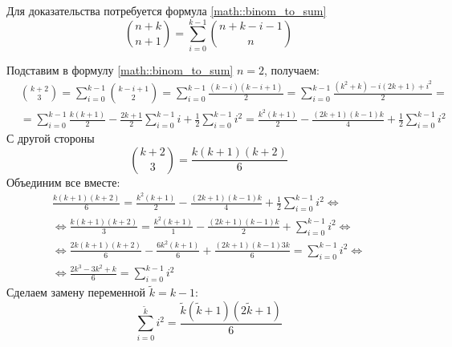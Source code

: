 \documentclass[a4paper,12pt]{article}
\begin{document}
\begin{Solution}
Для доказательства потребуется формула \ref{math::binom_to_sum}
\begin{equation}
	\binom{n+k}{n+1} = \sum_{i=0}^{k-1} \binom{n+k-i-1}{n}
	\label{math::binom_to_sum}
\end{equation}

Подставим в формулу \ref{math::binom_to_sum} $n=2$, получаем:
\[
	\begin{split}
		& \binom{k+2}{3} = \sum_{i=0}^{k-1} \binom{k-i+1}{2} = \sum_{i=0}^{k-1} \frac{\left(k-i\right)\left(k-i+1\right)}{2} = \sum_{i=0}^{k-1} \frac{\left(k^2+k\right) - i\left(2k+1\right) + i^2}{2} = \\
		& = \sum_{i=0}^{k-1} \frac{k\left(k+1\right)}{2} - \frac{2k+1}{2}\sum_{i=0}^{k-1} i + \frac{1}{2}\sum_{i=0}^{k-1} i^2 = \frac{k^2\left(k+1\right)}{2} - \frac{\left(2k+1\right)\left(k-1\right)k}{4} + \frac{1}{2}\sum_{i=0}^{k-1} i^2
	\end{split}
\]
С другой стороны
\[
	\binom{k+2}{3} = \frac{k\left(k+1\right)\left(k+2\right)}{6}
\]
Объединим все вместе:
\begin{multline*}
	\frac{k\left(k+1\right)\left(k+2\right)}{6} = \frac{k^2\left(k+1\right)}{2} - \frac{\left(2k+1\right)\left(k-1\right)k}{4} + \frac{1}{2}\sum_{i=0}^{k-1} i^2 \Leftrightarrow \\
	\Leftrightarrow \frac{k\left(k+1\right)\left(k+2\right)}{3} = \frac{k^2\left(k+1\right)}{1} - \frac{\left(2k+1\right)\left(k-1\right)k}{2} + \sum_{i=0}^{k-1} i^2 \Leftrightarrow \\
	\Leftrightarrow \frac{2k\left(k+1\right)\left(k+2\right)}{6} - \frac{6k^2\left(k+1\right)}{6} + \frac{\left(2k+1\right)\left(k-1\right)3k}{6} = \sum_{i=0}^{k-1} i^2 \Leftrightarrow \\
	\Leftrightarrow \frac{2k^3-3k^2+k}{6} = \sum_{i=0}^{k-1} i^2
\end{multline*}
Сделаем замену переменной $\tilde k = k-1$:
\begin{equation}
	\sum_{i=0}^{\tilde k} i^2 = \frac{\tilde k\left(\tilde k + 1\right)\left(2 \tilde k + 1\right)}{6}
	\label{math::sum_of_squares}
\end{equation}


\end{Solution}
\end{document}
